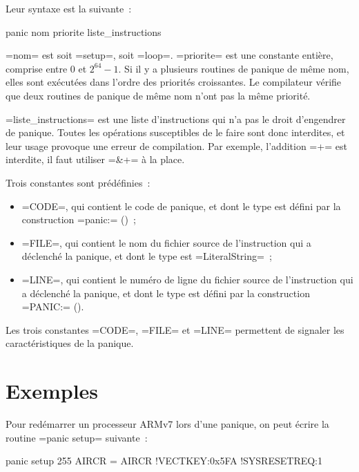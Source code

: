 Leur syntaxe est la suivante~:
\begin{PLM}
panic nom priorite {
  liste_instructions
}
\end{PLM}

\plm=nom= est soit \plm=setup=, soit \plm=loop=. \plm=priorite= est une constante entière, comprise entre $0$ et $2^{64}-1$. Si il y a plusieurs routines de panique de même nom, elles sont exécutées dans l'ordre des priorités croissantes. Le compilateur vérifie que deux routines de panique de même nom n'ont pas la même priorité.

\plm=liste_instructions= est une liste d'instructions qui n'a pas le droit d'engendrer de panique. Toutes les opérations susceptibles de le faire sont donc interdites, et leur usage provoque une erreur de compilation. Par exemple, l'addition \plm=+= est interdite, il faut utiliser \plm=&+= à la place.

Trois constantes sont prédéfinies~:
\begin{itemize}
  \item \plm=CODE=, qui contient le code de panique, et dont le type est défini par la construction \plm=panic:= ()~;
  \item \plm=FILE=, qui contient le nom du fichier source de l'instruction qui a déclenché la panique, et dont le type est \plm=LiteralString=~;
  \item \plm=LINE=, qui contient le numéro de ligne du fichier source de l'instruction qui a déclenché la panique, et dont le type est défini par la construction \plm=PANIC:= ().
\end{itemize}

Les trois constantes \plm=CODE=, \plm=FILE= et \plm=LINE= permettent de signaler les caractéristiques de la panique.


\section{Exemples}

Pour redémarrer un processeur ARMv7 lors d'une panique, on peut écrire la routine \plm=panic setup= suivante~:
\begin{PLM}
panic setup 255 {
  AIRCR = {AIRCR !VECTKEY:0x5FA !SYSRESETREQ:1}
}
\end{PLM}
